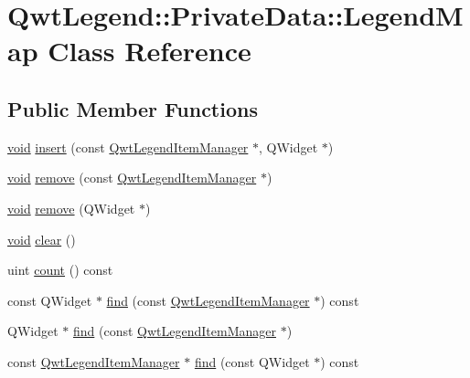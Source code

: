 \hypertarget{class_qwt_legend_1_1_private_data_1_1_legend_map}{\section{Qwt\-Legend\-:\-:Private\-Data\-:\-:Legend\-Map Class Reference}
\label{class_qwt_legend_1_1_private_data_1_1_legend_map}
}
\subsection*{Public Member Functions}
\begin{DoxyCompactItemize}
\item 
\hyperlink{group___u_a_v_objects_plugin_ga444cf2ff3f0ecbe028adce838d373f5c}{void} \hyperlink{class_qwt_legend_1_1_private_data_1_1_legend_map_a8fd01a838df303905856f8f824db7dec}{insert} (const \hyperlink{class_qwt_legend_item_manager}{Qwt\-Legend\-Item\-Manager} $\ast$, Q\-Widget $\ast$)
\item 
\hyperlink{group___u_a_v_objects_plugin_ga444cf2ff3f0ecbe028adce838d373f5c}{void} \hyperlink{class_qwt_legend_1_1_private_data_1_1_legend_map_addf13893f2771b7a3ca7faf6fb714f74}{remove} (const \hyperlink{class_qwt_legend_item_manager}{Qwt\-Legend\-Item\-Manager} $\ast$)
\item 
\hyperlink{group___u_a_v_objects_plugin_ga444cf2ff3f0ecbe028adce838d373f5c}{void} \hyperlink{class_qwt_legend_1_1_private_data_1_1_legend_map_ab5752138ab559c110497fe0afde43333}{remove} (Q\-Widget $\ast$)
\item 
\hyperlink{group___u_a_v_objects_plugin_ga444cf2ff3f0ecbe028adce838d373f5c}{void} \hyperlink{class_qwt_legend_1_1_private_data_1_1_legend_map_ae6043397f5671ad72d06011bd92f41ce}{clear} ()
\item 
uint \hyperlink{class_qwt_legend_1_1_private_data_1_1_legend_map_a9cae1ab70c95520065fb2cee5ba4c523}{count} () const 
\item 
const Q\-Widget $\ast$ \hyperlink{class_qwt_legend_1_1_private_data_1_1_legend_map_a49a7803f5f0e728244b76e1dd268fcd0}{find} (const \hyperlink{class_qwt_legend_item_manager}{Qwt\-Legend\-Item\-Manager} $\ast$) const 
\item 
Q\-Widget $\ast$ \hyperlink{class_qwt_legend_1_1_private_data_1_1_legend_map_a397342ff5c799176c63552420b07b115}{find} (const \hyperlink{class_qwt_legend_item_manager}{Qwt\-Legend\-Item\-Manager} $\ast$)
\item 
const \hyperlink{class_qwt_legend_item_manager}{Qwt\-Legend\-Item\-Manager} $\ast$ \hyperlink{class_qwt_legend_1_1_private_data_1_1_legend_map_a5ddd3f7937c02a9476f0bac833afdc7b}{find} (const Q\-Widget $\ast$) const 

\end{DoxyCompactItemize}

